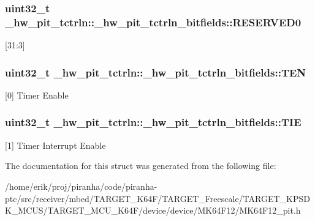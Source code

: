 \subsubsection[{\texorpdfstring{R\+E\+S\+E\+R\+V\+E\+D0}{RESERVED0}}]{\setlength{\rightskip}{0pt plus 5cm}uint32\+\_\+t \+\_\+hw\+\_\+pit\+\_\+tctrln\+::\+\_\+hw\+\_\+pit\+\_\+tctrln\+\_\+bitfields\+::\+R\+E\+S\+E\+R\+V\+E\+D0}\hypertarget{struct__hw__pit__tctrln_1_1__hw__pit__tctrln__bitfields_a80be84f9714d4426b277093c24de0154}{}\label{struct__hw__pit__tctrln_1_1__hw__pit__tctrln__bitfields_a80be84f9714d4426b277093c24de0154}
\mbox{[}31\+:3\mbox{]} 
\subsubsection[{\texorpdfstring{T\+EN}{TEN}}]{\setlength{\rightskip}{0pt plus 5cm}uint32\+\_\+t \+\_\+hw\+\_\+pit\+\_\+tctrln\+::\+\_\+hw\+\_\+pit\+\_\+tctrln\+\_\+bitfields\+::\+T\+EN}\hypertarget{struct__hw__pit__tctrln_1_1__hw__pit__tctrln__bitfields_a1a50e0c4edd650992ae48e240d6c4945}{}\label{struct__hw__pit__tctrln_1_1__hw__pit__tctrln__bitfields_a1a50e0c4edd650992ae48e240d6c4945}
\mbox{[}0\mbox{]} Timer Enable 
\subsubsection[{\texorpdfstring{T\+IE}{TIE}}]{\setlength{\rightskip}{0pt plus 5cm}uint32\+\_\+t \+\_\+hw\+\_\+pit\+\_\+tctrln\+::\+\_\+hw\+\_\+pit\+\_\+tctrln\+\_\+bitfields\+::\+T\+IE}\hypertarget{struct__hw__pit__tctrln_1_1__hw__pit__tctrln__bitfields_ac7d0a641ba437fa6e5ee748e3681dac6}{}\label{struct__hw__pit__tctrln_1_1__hw__pit__tctrln__bitfields_ac7d0a641ba437fa6e5ee748e3681dac6}
\mbox{[}1\mbox{]} Timer Interrupt Enable 

The documentation for this struct was generated from the following file\+:\begin{DoxyCompactItemize}
\item 
/home/erik/proj/piranha/code/piranha-\/ptc/src/receiver/mbed/\+T\+A\+R\+G\+E\+T\+\_\+\+K64\+F/\+T\+A\+R\+G\+E\+T\+\_\+\+Freescale/\+T\+A\+R\+G\+E\+T\+\_\+\+K\+P\+S\+D\+K\+\_\+\+M\+C\+U\+S/\+T\+A\+R\+G\+E\+T\+\_\+\+M\+C\+U\+\_\+\+K64\+F/device/device/\+M\+K64\+F12/M\+K64\+F12\+\_\+pit.\+h\end{DoxyCompactItemize}
